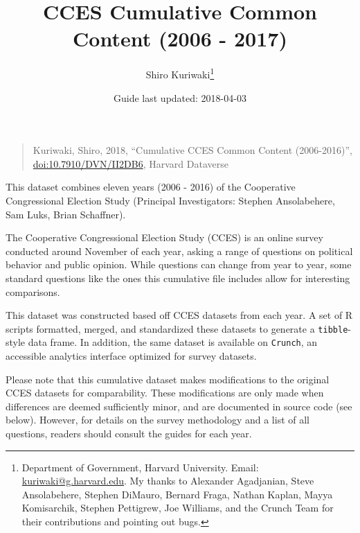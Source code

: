 \documentclass[10pt,article,oneside]{memoir}
\title{ \LARGE\textbf{CCES Cumulative Common Content (2006 - 2017)}}
\author{Shiro Kuriwaki\thanks{Department of Government, Harvard University. Email:
\url{kuriwaki@g.harvard.edu}. My thanks to Alexander Agadjanian, Steve
Ansolabehere, Stephen DiMauro, Bernard Fraga, Nathan Kaplan, Mayya
Komisarchik, Stephen Pettigrew, Joe Williams, and the Crunch Team for
their contributions and pointing out bugs.}  }
\date{Guide last updated: 2018-04-03}
\theoremstyle{definition}
\begin{document}
\maketitle





\renewcommand\UrlFont{\color{crimson}\ttfamily}
















\begin{quote}
Kuriwaki, Shiro, 2018, ``Cumulative CCES Common Content (2006-2016)'',
\href{https://dataverse.harvard.edu/dataset.xhtml?persistentId=doi:10.7910/DVN/II2DB6}{\url{doi:10.7910/DVN/II2DB6}},
Harvard Dataverse
\end{quote}

\noindent This dataset combines eleven years (2006 - 2016) of the
Cooperative Congressional Election Study (Principal Investigators:
Stephen Ansolabehere, Sam Luks, Brian Schaffner).

The Cooperative Congressional Election Study (CCES) is an online survey
conducted around November of each year, asking a range of questions on
political behavior and public opinion. While questions can change from
year to year, some standard questions like the ones this cumulative file
includes allow for interesting comparisons.

This dataset was constructed based off CCES datasets from each year. A
set of R scripts formatted, merged, and standardized these datasets to
generate a \texttt{tibble}-style data frame. In addition, the same
dataset is available on \texttt{Crunch}, an accessible analytics
interface optimized for survey datasets.

Please note that this cumulative dataset makes modifications to the
original CCES datasets for comparability. These modifications are only
made when differences are deemed sufficiently minor, and are documented
in source code (see below). However, for details on the survey
methodology and a list of all questions, readers should consult the
guides for each year.

\bigskip
\end{document}
